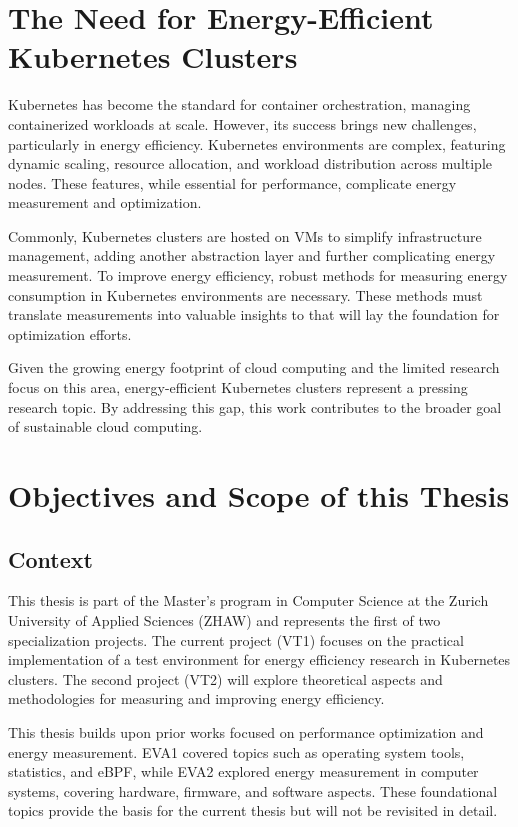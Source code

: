 \section{The Need for Energy-Efficient Kubernetes Clusters}

Kubernetes has become the standard for container orchestration, managing containerized workloads at scale. However, its success brings new challenges, particularly in energy efficiency. Kubernetes environments are complex, featuring dynamic scaling, resource allocation, and workload distribution across multiple nodes. These features, while essential for performance, complicate energy measurement and optimization.

Commonly, Kubernetes clusters are hosted on VMs to simplify infrastructure management, adding another abstraction layer and further complicating energy measurement. To improve energy efficiency, robust methods for measuring energy consumption in Kubernetes environments are necessary. These methods must translate measurements into valuable insights to that will lay the foundation for optimization efforts.

Given the growing energy footprint of cloud computing and the limited research focus on this area, energy-efficient Kubernetes clusters represent a pressing research topic. By addressing this gap, this work contributes to the broader goal of sustainable cloud computing.

\section{Objectives and Scope of this Thesis}

\subsection{Context}

This thesis is part of the Master's program in Computer Science at the Zurich University of Applied Sciences (ZHAW) and represents the first of two specialization projects. The current project (VT1) focuses on the practical implementation of a test environment for energy efficiency research in Kubernetes clusters. The second project (VT2) will explore theoretical aspects and methodologies for measuring and improving energy efficiency.

This thesis builds upon prior works focused on performance optimization and energy measurement. EVA1 covered topics such as operating system tools, statistics, and eBPF, while EVA2 explored energy measurement in computer systems, covering hardware, firmware, and software aspects. These foundational topics provide the basis for the current thesis but will not be revisited in detail.

